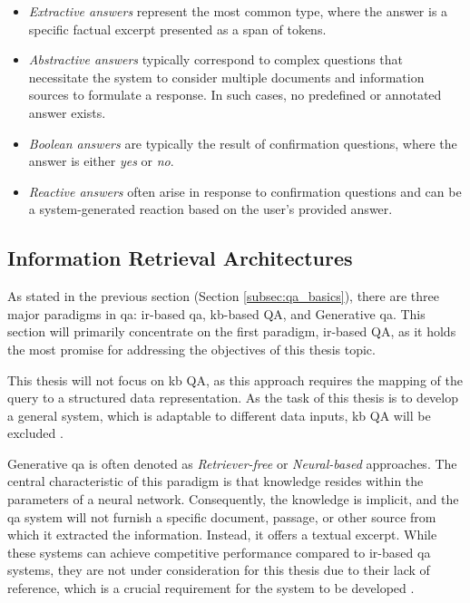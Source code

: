\begin{itemize}
   \item \textit{Extractive answers} represent the most common type, where the answer is a specific factual excerpt presented as a span of tokens.

   \item \textit{Abstractive answers} typically correspond to complex questions that necessitate the system to consider multiple documents and information sources to formulate a response. In such cases, no predefined or annotated answer exists.

   \item \textit{Boolean answers} are typically the result of confirmation questions, where the answer is either \textit{yes} or \textit{no}.

   \item \textit{Reactive answers} often arise in response to confirmation questions and can be a system-generated reaction based on the user's provided answer.
\end{itemize}


\subsection{Information Retrieval Architectures}
\label{subsec:qa_architectures}

As stated in the previous section (Section \ref{subsec:qa_basics}), there are three major paradigms in \gls{qa}: \gls{ir}-based \gls{qa}, \gls{kb}-based QA, and Generative \gls{qa}. This section will primarily concentrate on the first paradigm, \gls{ir}-based QA, as it holds the most promise for addressing the objectives of this thesis topic.

This thesis will not focus on \gls{kb} QA, as this approach requires the mapping of the query to a structured data representation. As the task of this thesis is to develop a general system, which is adaptable to different data inputs, \gls{kb} QA will be excluded \cite{dimitrakis_survey_2020}.

Generative \gls{qa} is often denoted as \textit{Retriever-free} or \textit{Neural-based} approaches. The central characteristic of this paradigm is that knowledge resides within the parameters of a neural network. Consequently, the knowledge is implicit, and the \gls{qa} system will not furnish a specific document, passage, or other source from which it extracted the information. Instead, it offers a textual excerpt. While these systems can achieve competitive performance compared to \gls{ir}-based \gls{qa} systems, they are not under consideration for this thesis due to their lack of reference, which is a crucial requirement for the system to be developed \cite{roberts_how_2020}.


